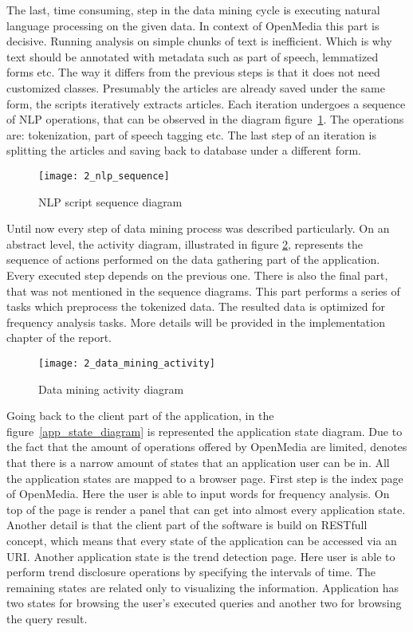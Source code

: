 The last, time consuming, step in the data mining cycle is executing natural language processing on the given data. In context of OpenMedia this part is decisive. Running analysis on simple chunks of text is inefficient. Which is why text should be annotated with metadata such as part of speech, lemmatized forms etc. The way it differs from the previous steps is that it does not need customized classes. Presumably the articles are already saved under the same form, the scripts iteratively extracts articles. Each iteration undergoes a sequence of NLP operations, that can be observed in the diagram \mbox{figure \ref{nlp_sequence}}. The operations are: tokenization, part of speech tagging etc. The last step of an iteration is splitting the articles and saving back to database under a different form.

\begin{figure}[!ht]
\centering
\vspace*{0.6cm}
\texttt{[image: 2\_nlp\_sequence]}
\caption{NLP script sequence diagram}\label{nlp_sequence}
\end{figure}

Until now every step of data mining process was described particularly. On an abstract level, the activity diagram, illustrated in figure \mbox{\ref{data_mining_activity}}, represents the sequence of actions performed on the data gathering part of the application. Every executed step depends on the previous one. There is also the final part, that was not mentioned in the sequence diagrams. This part performs a series of tasks which preprocess the tokenized data. The resulted data is optimized for frequency analysis tasks. More details will be provided in the implementation chapter of the report.

\begin{figure}[!ht]
\centering
\texttt{[image: 2\_data\_mining\_activity]}
\caption{Data mining activity diagram}\label{data_mining_activity}
\end{figure}

Going back to the client part of the application, in the \mbox{figure \ref{app_state_diagram}} is represented the application state diagram. Due to the fact that the amount of operations offered by OpenMedia are limited, denotes that there is a narrow amount of states that an application user can be in. All the application states are mapped to a browser page. First step is the index page of OpenMedia. Here the user is able to input words for frequency analysis. On top of the page is render a panel that can get into almost every application state. Another detail is that the client part of the software is build on RESTfull concept, which means that every state of the application can be accessed via an URI. Another application state is the trend detection page. Here user is able to perform trend disclosure operations by specifying the intervals of time. The remaining states are related only to visualizing the information. Application has two states for browsing the user's executed queries and another two for browsing the query result.

